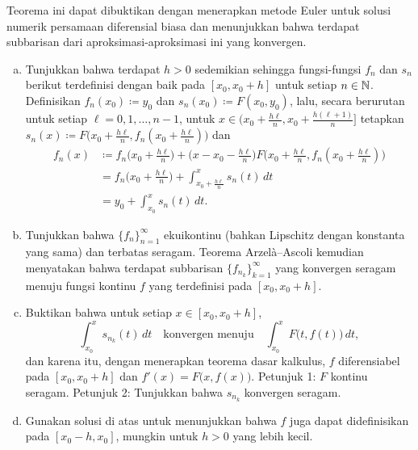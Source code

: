 \begin{exercise}
Teorema ini dapat dibuktikan dengan menerapkan metode Euler
untuk solusi numerik persamaan diferensial biasa dan menunjukkan bahwa
terdapat subbarisan dari aproksimasi-aproksimasi ini yang konvergen.
\begin{enumerate}[a)]
\item
Tunjukkan
bahwa terdapat $h > 0$ sedemikian sehingga fungsi-fungsi
$f_n$ dan $s_n$ berikut terdefinisi dengan baik pada $[x_0,x_0+h]$
untuk setiap $n \in {\mathbb{N}}$.
Definisikan $f_n(x_0) \coloneqq y_0$ dan $s_n(x_0) \coloneqq F(x_0,y_0)$,
lalu, secara berurutan untuk setiap $\ell=0,1,\ldots,n-1$,
untuk $x \in \bigl(x_0+\frac{h\ell}{n},x_0+\frac{h(\ell+1)}{n}\bigr]$
tetapkan $s_n(x) \coloneqq F\bigl(x_0+\tfrac{h\ell}{n},
f_n(x_0+\tfrac{h\ell}{n})\bigr)$ dan
\begin{equation*}
\begin{split}
f_n(x) & \coloneqq f_n\bigl(x_0+\tfrac{h\ell}{n}\bigr)
+ \bigl(x-x_0-\tfrac{h\ell}{n}\bigr) F\bigl(x_0+\tfrac{h\ell}{n},
f_n(x_0+\tfrac{h\ell}{n}) \bigr) \\
& = f_n\bigl(x_0+\tfrac{h\ell}{n}\bigr)
+ \int_{x_0+\tfrac{h\ell}{n}}^x s_n(t) \, dt \\
& = y_0
+ \int_{x_0}^x s_n(t) \, dt .
\end{split}
\end{equation*}
\item
Tunjukkan bahwa $\{ f_n \}_{n=1}^\infty$ ekuikontinu
(bahkan Lipschitz dengan konstanta yang sama) dan terbatas seragam.
Teorema Arzel\`a--Ascoli kemudian menyatakan bahwa terdapat
subbarisan $\{ f_{n_k} \}_{k=1}^\infty$ yang konvergen seragam
menuju fungsi kontinu $f$ yang terdefinisi pada $[x_0,x_0+h]$.
\item
Buktikan bahwa untuk setiap $x \in [x_0,x_0+h]$,
\begin{equation*}
\int_{x_0}^x s_{n_k}(t) \, dt
\quad
\text{konvergen menuju}
\quad
\int_{x_0}^x F\bigl(t,f(t)\bigr) \, dt ,
\end{equation*}
dan karena itu, dengan menerapkan teorema dasar kalkulus,
$f$ diferensiabel pada $[x_0,x_0+h]$ dan $f'(x) = F\bigl(x,f(x)\bigr)$.
Petunjuk 1: $F$ kontinu seragam.
Petunjuk 2: Tunjukkan bahwa $s_{n_k}$ konvergen seragam.
\item
Gunakan solusi di atas untuk menunjukkan bahwa $f$ juga dapat didefinisikan
pada $[x_0-h,x_0]$,
mungkin untuk $h > 0$ yang lebih kecil.
\end{enumerate}
\end{exercise}


